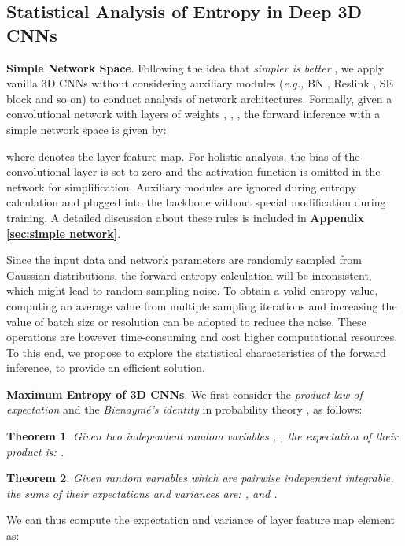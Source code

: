 \documentclass{article} \usepackage{iclr2023_conference,times}
\def\eg{\emph{e.g., }}
\newtheorem{theorem}{Theorem}
\begin{document}
\subsection{Statistical Analysis of Entropy in Deep 3D CNNs}





\noindent\textbf{Simple Network Space}.
Following the idea that \textit{simpler is better} \citep{lin2021zen,sun2022mae}, we apply vanilla 3D CNNs without considering auxiliary modules (\eg BN \citep{ioffe2015batch}, Reslink \citep{he2016deep}, SE block \citep{hu2018squeeze} and so on) to conduct analysis of network architectures.
Formally, given a convolutional network with  layers of weights ,  ,  , the forward inference with a  simple network space is given by:

where  denotes the  layer feature map. For holistic analysis, the bias of the convolutional layer is set to zero and the activation function is omitted in the network for simplification.
Auxiliary modules are ignored during entropy calculation and plugged into the backbone without special modification during training.
A detailed discussion about these rules is included in \textbf{Appendix \ref{sec:simple network}}.


Since the input data and network parameters are randomly sampled from Gaussian distributions, the forward entropy calculation will be inconsistent, which might lead to random sampling noise.
To obtain a valid entropy value, computing an average value from multiple sampling iterations and increasing the value of batch size or resolution can be adopted to reduce the noise. 
These operations are however time-consuming and cost higher computational resources.
To this end, we propose to explore the statistical characteristics of the forward inference, to provide an efficient solution. 




\noindent\textbf{Maximum Entropy of 3D CNNs}.
We first consider the \textit{product law of expectation} \citep{mood1950introduction} and the \textit{Bienaymé's identity} in probability theory \citep{loeve2017probability}, as follows:
\begin{theorem}
Given two independent random variables , , the expectation of their product  is: .
\label{trm:product}
\end{theorem}
\begin{theorem}
Given  random variables  which are pairwise independent integrable, the sums of their expectations and variances are: , and .
\label{trm:sum}
\end{theorem}
We can thus compute the expectation and variance of  layer feature map element  as:
 
\end{document}
